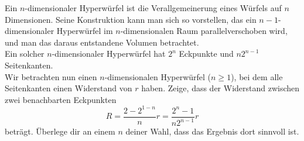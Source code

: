 \begin{Exercise}[label = hypercube, origin = Aaron Wild, difficulty = 5, title =  Widerstandswürfel]
Ein $n$-dimensionaler Hyperwürfel ist die Verallgemeinerung eines Würfels auf $n$ Dimensionen. Seine Konstruktion kann man sich so vorstellen, das ein $n-1$-dimensionaler Hyperwürfel im $n$-dimensionalen Raum parallelverschoben wird, und man das daraus entstandene Volumen betrachtet.\\
Ein solcher $n$-dimensionaler Hyperwürfel hat $2^n$ Eckpunkte und $n2^{n-1}$ Seitenkanten.\\
Wir betrachten nun einen $n$-dimensionalen Hyperwürfel ($n\geq 1$), bei dem alle Seitenkanten einen Widerstand von $r$ haben. Zeige, dass der Widerstand zwischen zwei benachbarten Eckpunkten 
\begin{equation}
	R = \frac{2-2^{1-n}}{n}r = \frac{2^n-1}{n2^{n-1}}r
\end{equation}
beträgt. Überlege dir an einem $n$ deiner Wahl, dass das Ergebnis dort sinnvoll ist.
\end{Exercise}